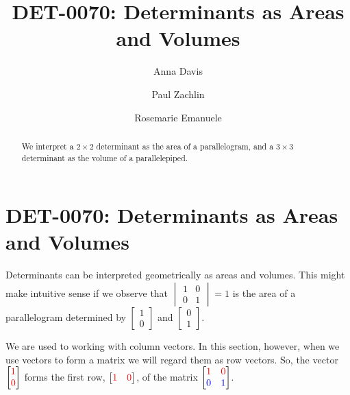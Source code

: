 \documentclass{ximera}
\author{Anna Davis \and Paul Zachlin \and Rosemarie Emanuele} \title{DET-0070: Determinants as Areas and Volumes} \license{CC-BY 4.0}
\begin{document}
\begin{abstract}
 We interpret a $2\times 2$ determinant as the area of a parallelogram, and a $3\times 3$ determinant as the volume of a parallelepiped.
\end{abstract}
\maketitle

\section*{DET-0070: Determinants as Areas and Volumes}

Determinants can be interpreted geometrically as areas and volumes.  This might make intuitive sense if we observe that $\begin{vmatrix}1&0\\0&1\end{vmatrix}=1$ is the area of a parallelogram determined by $\begin{bmatrix}1\\0\end{bmatrix}$ and $\begin{bmatrix}0\\1\end{bmatrix}$.    

\begin{center}
\end{center}
We are used to working with column vectors.  In this section, however, when we use vectors to form a matrix we will regard them as row vectors.  So, the vector $\begin{bmatrix}{\color{red}1}\\{\color{red}0}\end{bmatrix}$ forms the first row, $\begin{bmatrix}{\color{red}1}&{\color{red}0}\end{bmatrix}$, of the matrix $\begin{bmatrix}{\color{red}1}&{\color{red}0}\\{\color{blue}0}&{\color{blue}1}\end{bmatrix}$.
\end{document}
